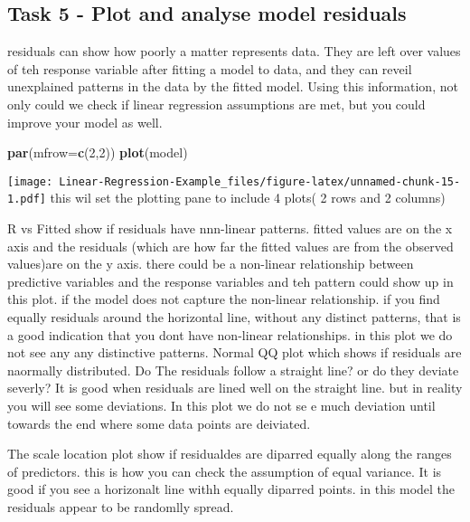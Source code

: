 \documentclass[
]{article}
\newenvironment{Shaded}{\begin{snugshade}}{\end{snugshade}}
\newcommand{\DataTypeTok}[1]{\textcolor[rgb]{0.13,0.29,0.53}{#1}}
\newcommand{\DecValTok}[1]{\textcolor[rgb]{0.00,0.00,0.81}{#1}}
\newcommand{\KeywordTok}[1]{\textcolor[rgb]{0.13,0.29,0.53}{\textbf{#1}}}
\newcommand{\NormalTok}[1]{#1}
\begin{document}
\hypertarget{task-5---plot-and-analyse-model-residuals}{%
\subsection{Task 5 - Plot and analyse model
residuals}\label{task-5---plot-and-analyse-model-residuals}}

residuals can show how poorly a matter represents data. They are left
over values of teh response variable after fitting a model to data, and
they can reveil unexplained patterns in the data by the fitted model.
Using this information, not only could we check if linear regression
assumptions are met, but you could improve your model as well.

\begin{Shaded}
\begin{Highlighting}[]
\KeywordTok{par}\NormalTok{(}\DataTypeTok{mfrow=}\KeywordTok{c}\NormalTok{(}\DecValTok{2}\NormalTok{,}\DecValTok{2}\NormalTok{))}
\KeywordTok{plot}\NormalTok{(model)}
\end{Highlighting}
\end{Shaded}

\texttt{[image: Linear-Regression-Example\_files/figure-latex/unnamed-chunk-15-1.pdf]}
this wil set the plotting pane to include 4 plots( 2 rows and 2 columns)

R vs Fitted show if residuals have nnn-linear patterns. fitted values
are on the x axis and the residuals (which are how far the fitted values
are from the observed values)are on the y axis. there could be a
non-linear relationship between predictive variables and the response
variables and teh pattern could show up in this plot. if the model does
not capture the non-linear relationship. if you find equally residuals
around the horizontal line, without any distinct patterns, that is a
good indication that you dont have non-linear relationships. in this
plot we do not see any any distinctive patterns. Normal QQ plot which
shows if residuals are naormally distributed. Do The residuals follow a
straight line? or do they deviate severly? It is good when residuals are
lined well on the straight line. but in reality you will see some
deviations. In this plot we do not se e much deviation until towards the
end where some data points are deiviated.

The scale location plot show if residualdes are diparred equally along
the ranges of predictors. this is how you can check the assumption of
equal variance. It is good if you see a horizonalt line withh equally
diparred points. in this model the residuals appear to be randomlly
spread.
\end{document}
